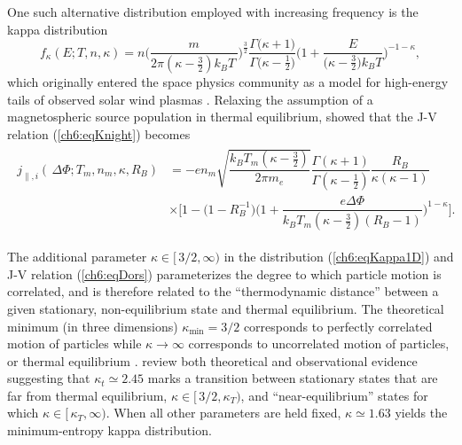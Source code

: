   One such alternative distribution employed with increasing frequency
  is the kappa distribution \citep{Livadiotis2013}
  \begin{equation} \label{ch6:eqKappa1D} f_{\kappa}(E; T, n, \kappa) =
    n \Bigg ( \dfrac{m}{2 \pi (\kappa - \frac{3}{2}) k_{B} T \, } \Bigg
    )^{\frac{3}{2}} \dfrac{\Gamma \big ( \kappa + 1 \big ) }{\Gamma
      \big ( \kappa - \frac{1}{2} \big ) } \Bigg ( 1 + \dfrac{E}{ \big
      ( \kappa - \frac{3}{2} \big ) k_B T } \Bigg )^{-1 - \kappa},
  \end{equation}
 which originally entered the space physics community as a model for
 high-energy tails of observed solar wind plasmas
 \citep{Vasyliunas1968}. Relaxing the assumption of a magnetospheric
 source population in thermal equilibrium, \citet{Dors1999} showed
 that the J-V relation (\ref{ch6:eqKnight}) becomes
 \begin{align}
   \label{ch6:eqDors}
 \begin{array}{ll}
   j_{\parallel,i} ( \, \Delta \Phi ; T_m, n_m, \kappa, R_B ) &= - e n_m \sqrt{ \dfrac{ k_B T_m (\kappa -
       \frac{3}{2})}{ 2 \pi m_e}} \dfrac{\Gamma (\kappa + 1)}{\Gamma (\kappa - \frac{1}{2})} \dfrac{R_B}{\kappa (\kappa - 1)} \\
   &\times \Bigg[1 - \Big(1 - R_B^{-1} \Big) \Bigg(1+\dfrac{e \Delta \Phi}{ k_B
     T_m (\kappa - \frac{3}{2})(R_B - 1)} \Bigg)^{1-\kappa} \Bigg].
 \end{array}
 \end{align}

 The additional parameter $\kappa \in [ \, 3/2, \infty )$ in the
 distribution (\ref{ch6:eqKappa1D}) and J-V relation
 (\ref{ch6:eqDors}) parameterizes the degree to which particle motion
 is correlated, and is therefore related to the ``thermodynamic
 distance'' between a given stationary, non-equilibrium state and
 thermal equilibrium. The theoretical minimum (in three dimensions)
 $\kappa_{\textrm{min}} = 3/2$ corresponds to perfectly correlated
 motion of particles while $\kappa \rightarrow \infty$ corresponds to
 uncorrelated motion of particles, or thermal equilibrium
 \citep{Livadiotis2010,Livadiotis2011,Livadiotis2013}. \citet{Livadiotis2010}
 review both theoretical and observational evidence suggesting that
 $\kappa_t \simeq 2.45$ marks a transition between stationary states
 that are far from thermal equilibrium, $\kappa \in [ \, 3/2, \kappa_T
 )$, and ``near-equilibrium'' states for which $\kappa \in [ \,
 \kappa_T, \infty )$. When all other parameters are held fixed,
 $\kappa \simeq 1.63$ yields the minimum-entropy kappa distribution.

